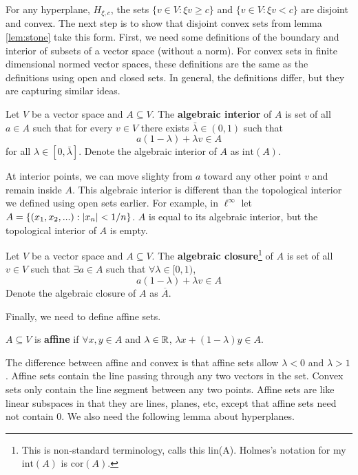 For any hyperplane, $H_{\xi,c}$, the sets $\{v \in V: \xi v \geq c\}$
and $\{v \in V: \xi v < c\}$ are disjoint and convex. The next step is
to show that disjoint convex sets from lemma \ref{lem:stone} take this
form. First, we need some definitions of the boundary and interior of
subsets of a vector space (without a norm). For convex sets in finite
dimensional normed vector spaces, these definitions are the same as
the definitions using open and closed sets. In general, the
definitions differ, but they are capturing similar ideas. 
\begin{definition}
  Let $V$ be a vector space and $A \subseteq V$. The \textbf{algebraic
    interior} of $A$ is set of all $a \in A$ such that for every $v
  \in V$ there exists $\bar{\lambda} \in (0,1)$ such that 
  \[ a(1-\lambda) + \lambda v \in A \]
  for all $\lambda \in [0,\bar{\lambda}]$. Denote the algebraic
  interior of $A$ as $\mathrm{int}(A)$.
\end{definition}
At interior points, we can move slighty from $a$ toward any other
point $v$ and remain inside $A$. This algebraic interior is different
than the topological interior we defined using open sets earlier. For
example, in $\ell^\infty$ let $A = \{(x_1, x_2, ...) : \left\vert {x_n} \right\vert <
1/n \}$. $A$ is equal to its algebraic interior, but the topological
interior of $A$ is empty. 
\begin{definition}
  Let $V$ be a vector space and $A \subseteq V$. The \textbf{algebraic
    closure}\footnote{This is non-standard terminology,
    \cite{holmes1975} calls this lin(A). Holmes's notation for my
    $\mathrm{int}(A)$ is $\mathrm{cor}(A)$.} of $A$ is set
  of all $v \in V$ such that $\exists a \in A$ such that
  $\forall \lambda \in [0,1)$,
  \[ a(1-\lambda) + \lambda v \in A \]
  Denote the algebraic closure of $A$ as $\overline{A}$.
\end{definition}
Finally, we need to define affine sets.
\begin{definition}
  $A \subseteq V$ is \textbf{affine} if $\forall x, y \in A$ and $\lambda \in
  \mathbb{R}$, $\lambda x + (1-\lambda)y \in A$.
\end{definition}
The difference between affine and convex is that affine sets allow
$\lambda <0$ and $\lambda >1$. Affine sets contain the line passing
through any two vectors in the set. Convex sets only contain the line
segment between any two points. Affine sets are like linear subspaces
in that they are lines, planes, etc, except that affine sets need not
contain $0$.  We also need the following lemma about hyperplanes.
